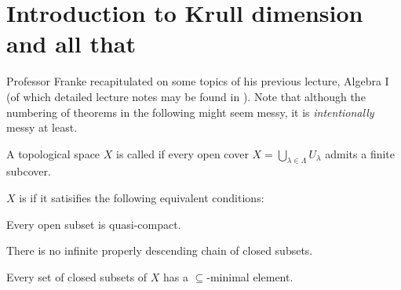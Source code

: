 \documentclass[a4paper,parskip=full,numbers=enddot]{scrreprt}
\begin{document}
\section*{Introduction to Krull dimension and all that}
Professor Franke recapitulated on some topics of his previous lecture, Algebra I (of which detailed lecture notes may be found in \cite{alg1}). Note that although the numbering of theorems in the following might seem messy, it is \emph{intentionally} messy at least.
\begin{defi}
 A topological space $X$ is called  if every open cover $X = \bigcup_{\lambda\in\Lambda} U_\lambda$ admits a finite subcover.
 
 $X$ is  if it satisifies the following equivalent conditions:
 \begin{alphanumerate}
    \item Every open subset is quasi-compact.
    \item There is no infinite properly descending chain of closed subsets.
    \item Every set of closed subsets of $X$ has a $\subseteq$-minimal element.
 \end{alphanumerate}
\end{defi}
\end{document}
